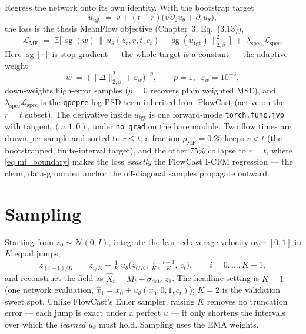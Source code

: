 \documentclass[11pt]{article}
\newcommand{\Mt}{M_t}
\newcommand{\ct}{c_t}
\newcommand{\sigd}{\sigma_{\mathrm{data}}}
\newcommand{\Norm}{\mathcal{N}}
\newcommand{\Exp}{\mathbb{E}}
\newcommand{\sg}{\operatorname{sg}}
\newcommand{\bnormb}[1]{\big\lVert #1 \big\rVert_{2,\beta}}
\newcommand{\code}[1]{\texttt{#1}}
\begin{document}
Regress the network onto its own identity. With the bootstrap target
\begin{equation}
  u_{\mathrm{tgt}} \;=\; v + (t-r)\big(v\,\partial_z u_\theta + \partial_r u_\theta\big),
  \label{eq:mf_target}
\end{equation}
the loss is the thesis MeanFlow objective (Chapter~3, Eq.~(3.13)),
\begin{equation}
  \mathcal{L}_{\mathrm{MF}}
   \;=\; \Exp\Big[\,\sg(w)\,
        \bnormb{\,u_\theta(z_r,r,t,\ct) - \sg(u_{\mathrm{tgt}})\,}^2\,\Big]
   \;+\; \lambda_{\mathrm{spec}}\,\mathcal{L}_{\mathrm{spec}}.
  \label{eq:mf_loss}
\end{equation}
Here $\sg[\cdot]$ is stop-gradient --- the whole target is a constant --- the
adaptive weight
\begin{equation}
  w \;=\; \big(\lVert\Delta\rVert_{2,\beta}^2 + \varepsilon_w\big)^{-p},
  \qquad p=1,\;\;\varepsilon_w=10^{-3},
  \label{eq:mf_weight}
\end{equation}
down-weights high-error samples ($p=0$ recovers plain weighted MSE), and
$\lambda_{\mathrm{spec}}\mathcal{L}_{\mathrm{spec}}$ is the \code{qpepre} log-PSD
term inherited from FlowCast (active on the $r=t$ subset). The derivative inside
$u_{\mathrm{tgt}}$ is one forward-mode \code{torch.func.jvp} with tangent
$(v,1,0)$, under \code{no\_grad} on the bare module. Two flow times are drawn per
sample and sorted to $r\le t$; a fraction $\rho_{\mathrm{MF}}=0.25$ keeps $r<t$
(the bootstrapped, finite-interval target), and the other $75\%$ collapse to
$r=t$, where \eqref{eq:mf_boundary} makes the loss \emph{exactly} the FlowCast
I-CFM regression --- the clean, data-grounded anchor the off-diagonal samples
propagate outward.

\section{Sampling}

Starting from $z_0\sim\Norm(0,I)$, integrate the learned average velocity over
$[0,1]$ in $K$ equal jumps,
\begin{equation}
  z_{(i+1)/K} \;=\; z_{i/K} + \tfrac{1}{K}\,
      u_\theta\!\big(z_{i/K},\,\tfrac{i}{K},\,\tfrac{i+1}{K},\,\ct\big),
  \qquad i=0,\dots,K-1,
  \label{eq:mf_sampler}
\end{equation}
and reconstruct the field as $\widehat{X}_t=\Mt+\sigd\,z_1$. The headline setting
is $K=1$ (one network evaluation, $\widehat{x}_1=x_0+u_\theta(x_0,0,1,\ct)$);
$K=2$ is the validation sweet spot. Unlike FlowCast's Euler sampler, raising $K$
removes no truncation error --- each jump is exact under a perfect $u$ --- it
only shortens the intervals over which the \emph{learned} $u_\theta$ must hold.
Sampling uses the EMA weights.
\end{document}
